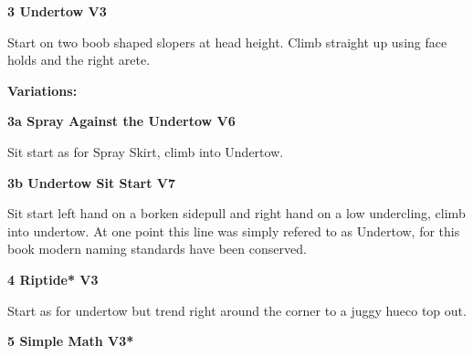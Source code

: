 \begin{multicols}{2}
			


			\needspace{1.5cm}
\label{rt:Undertow}
\colorbox{green!20}{
\parbox{0.95\linewidth}{
\textbf{
3 Undertow V3  
}}}

			\begin{adjustwidth}{0.5cm}{}			
			Start on two boob shaped slopers at head height. Climb straight up using face holds and the right arete.
			\end{adjustwidth}
			
				\begin{adjustwidth}{0.5cm}{}				
				\needspace{3cm}
				\textbf{Variations:} \newline
					
					\needspace{1.5cm}
\label{vr:Spray Against the Undertow}
\colorbox{RoyalBlue!20}{
\parbox{0.95\linewidth}{
\textbf{
3a Spray Against the Undertow V6  
}}}

					\begin{adjustwidth}{0.5cm}{}			
					Sit start as for Spray Skirt, climb into Undertow.
					\end{adjustwidth}
					
					
					
					\needspace{1.5cm}
\label{vr:Undertow Sit Start}
\colorbox{Goldenrod!50}{
\parbox{0.95\linewidth}{
\textbf{
3b Undertow Sit Start V7  
}}}

					\begin{adjustwidth}{0.5cm}{}			
					Sit start left hand on a borken sidepull and right hand on a low undercling, climb into undertow. At one point this line was simply refered to as Undertow, for this book modern naming standards have been conserved.
					\end{adjustwidth}
					
					
				\end{adjustwidth}
			
			
			\needspace{1.5cm}
\label{rt:Riptide}
\colorbox{green!20}{
\parbox{0.95\linewidth}{
\textbf{
4 Riptide* V3  
}}}

			\begin{adjustwidth}{0.5cm}{}			
			Start as for undertow but trend right around the corner to a juggy hueco top out.
			\end{adjustwidth}
			
			
			
			\needspace{1.5cm}
\label{rt:Simple Math}
\colorbox{green!20}{
\parbox{0.95\linewidth}{
\textbf{
5 Simple Math V3*  
}}}


\end{multicols}
